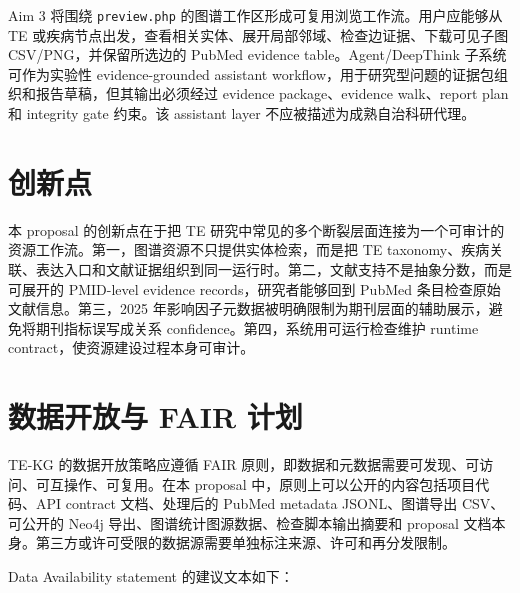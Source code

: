 \documentclass[12pt,a4paper,UTF8]{ctexart}
\begin{document}
Aim 3 将围绕 \texttt{preview.php} 的图谱工作区形成可复用浏览工作流。用户应能够从 TE 或疾病节点出发，查看相关实体、展开局部邻域、检查边证据、下载可见子图 CSV/PNG，并保留所选边的 PubMed evidence table。Agent/DeepThink 子系统可作为实验性 evidence-grounded assistant workflow，用于研究型问题的证据包组织和报告草稿，但其输出必须经过 evidence package、evidence walk、report plan 和 integrity gate 约束。该 assistant layer 不应被描述为成熟自治科研代理。

\section{创新点}

本 proposal 的创新点在于把 TE 研究中常见的多个断裂层面连接为一个可审计的资源工作流。第一，图谱资源不只提供实体检索，而是把 TE taxonomy、疾病关联、表达入口和文献证据组织到同一运行时。第二，文献支持不是抽象分数，而是可展开的 PMID-level evidence records，研究者能够回到 PubMed 条目检查原始文献信息。第三，2025 年影响因子元数据被明确限制为期刊层面的辅助展示，避免将期刊指标误写成关系 confidence。第四，系统用可运行检查维护 runtime contract，使资源建设过程本身可审计。

\section{数据开放与 FAIR 计划}

TE-KG 的数据开放策略应遵循 FAIR 原则，即数据和元数据需要可发现、可访问、可互操作、可复用\cite{wilkinson2016fair}。在本 proposal 中，原则上可以公开的内容包括项目代码、API contract 文档、处理后的 PubMed metadata JSONL、图谱导出 CSV、可公开的 Neo4j 导出、图谱统计图源数据、检查脚本输出摘要和 proposal 文档本身。第三方或许可受限的数据源需要单独标注来源、许可和再分发限制。

Data Availability statement 的建议文本如下：

\end{document}
